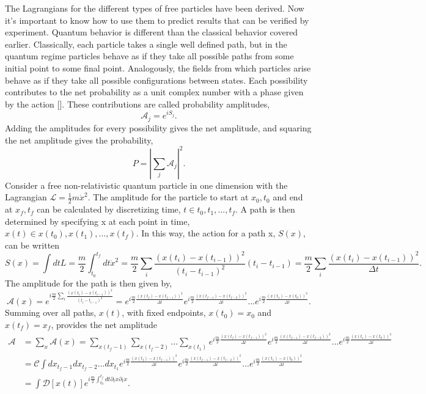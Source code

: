 The Lagrangians for the different types of free particles have been derived. Now it's important to know how to use them to predict results that can be verified by experiment. Quantum behavior is different than the classical behavior covered earlier. Classically, each particle takes a single well defined path, but in the quantum regime particles behave as if they take all possible paths from some initial point to some final point. Analogously, the fields from which particles arise behave as if they take all possible configurations between states. Each possibility contributes to the net probability as a unit complex number with a phase given by the action [\cite{feynhibbs}]. These contributions are called probability amplitudes, 
\begin{equation}
\mathcal{A}_j = e^{iS_{j}}. 
\end{equation}
Adding the amplitudes for every possibility gives the net amplitude, and squaring the net amplitude gives the probability,   
\begin{equation}
P = |\sum_j \mathcal{A}_j|^2.
\end{equation}
Consider a free non-relativistic quantum particle in one dimension with the Lagrangian $\mathcal{L} = \frac{1}{2}m\dot{x}^2$. The amplitude for the particle to start at $x_0, t_0$ and end at $x_f, t_f$ can be calculated by discretizing time, $t \in {t_0, t_1, ..., t_f}$. A path is then determined by specifying x at each point in time, $x(t) \in {x(t_0), x(t_1), ..., x(t_f)}$. In this way, the action for a path x, $S(x)$, can be written
\begin{equation}
S(x) = \int dt L = \frac{m}{2} \int_{t_0}^{t_f} dt \dot{x}^2 = \frac{m}{2} \sum_i \frac{(x(t_i) - x(t_{i-1}))^2}{(t_i - t_{i-1})^2} (t_i - t_{i-1})  
= \frac{m}{2} \sum_i \frac{(x(t_i) - x(t_{i-1}))^2}{\Delta t}.
\end{equation}
The amplitude for the path is then given by, 
\begin{equation}
\mathcal{A}(x) = e^{i\frac{m}{2} \sum_i \frac{(x(t_i) - x(t_{i-1}))^2}{(t_i - t_{i-1})^2}} = e^{i\frac{m}{2}\frac{(x(t_f) - x(t_{f-1}))^2}{\Delta t}}e^{i\frac{m}{2}\frac{(x(t_{f-1}) - x(t_{f-2}))^2}{\Delta t}}...e^{i\frac{m}{2}\frac{(x(t_1) - x(t_{0}))^2}{\Delta t}}.
\end{equation}
Summing over all paths, $x(t)$, with fixed endpoints, $x(t_0) = x_0$ and $x(t_f) = x_f$, provides the net amplitude 
\begin{equation}
\begin{split}
\mathcal{A} &= \sum_{x} \mathcal{A}(x) = \sum_{x(t_f-1)} \sum_{x(t_f-2)} ... \sum_{x(t_1)} 
e^{i\frac{m}{2}\frac{(x(t_f) - x(t_{f-1}))^2}{\Delta t}}e^{i\frac{m}{2}\frac{(x(t_{f-1}) - x(t_{f-2}))^2}{\Delta t}}...
e^{i\frac{m}{2}\frac{(x(t_1) - x(t_{0}))^2}{\Delta t}} \\
&= \mathcal{C} \int dx_{t_f-1}dx_{t_f-2}...dx_{t_1} 
e^{i\frac{m}{2}\frac{(x(t_f) - x(t_{f-1}))^2}{\Delta t}}e^{i\frac{m}{2}\frac{(x(t_{f-1}) - x(t_{f-2}))^2}{\Delta t}}...
e^{i\frac{m}{2}\frac{(x(t_1) - x(t_{0}))^2}{\Delta t}}\\
& = \int \mathcal{D}[x(t)] e^{i\frac{m}{2}\int_{t_0}^{t_f} dt \partial_t x \partial_t x}.\\
\end{split}
\end{equation} 
